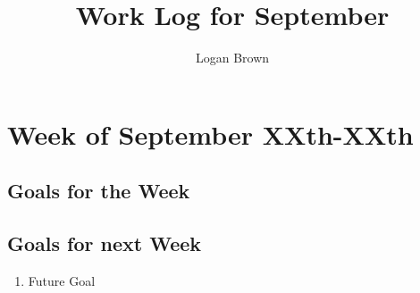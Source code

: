 

\title{Work Log for September}
\author{Logan Brown}


\maketitle


\setcounter{section}{0} %
\setcounter{subsection}{-1}
\setcounter{subsubsection}{0}

\section{Week of September XXth-XXth}
\subsection{Goals for the Week}



\subsection{Goals for next Week}
\begin{enumerate}
\item Future Goal
\end{enumerate}



